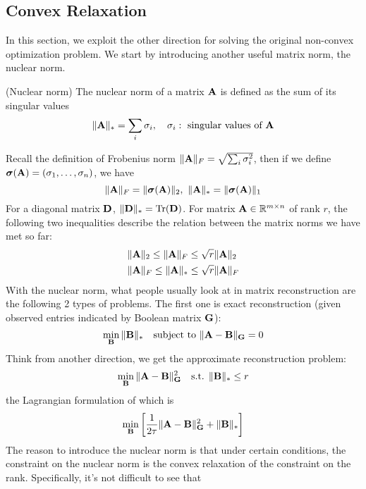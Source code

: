 \documentclass[../book-template.tex]{subfiles}
\begin{document}
\subsection{Convex Relaxation}
In this section, we exploit the other direction for solving the original non-convex optimization problem. We start by introducing another useful matrix norm, the nuclear norm.
\begin{definition}
	(Nuclear norm) The nuclear norm of a matrix ${\bf A}$ is defined as the sum of its singular values
	\begin{equation*}
		\|{\bf A}\|_*=\sum_{i}\sigma_i,\quad \sigma_i:\text{ singular values of }{\bf A}
	\end{equation*}
\end{definition}
Recall the definition of Frobenius norm $\|{\bf A}\|_F=\sqrt{\sum_{i}\sigma_i^2}$, then if we define $\bm{\sigma}({\bf A})=(\sigma_1,\dots,\sigma_n)$, we have
\begin{equation*}
	\|{\bf A}\|_F = \|\bm{\sigma}({\bf A})\|_2,\ \|{\bf A}\|_*=\|\bm{\sigma}({\bf A})\|_1
\end{equation*}
For a diagonal matrix ${\bf D}$, $\|{\bf D}\|_*=\text{Tr}({\bf D})$. For matrix ${\bf A}\in\mathbb{R}^{m\times n}$ of rank $r$, the following two inequalities describe the relation between the matrix norms we have met so far:
\begin{align*}
	&\|{\bf A}\|_2\leq \|{\bf A}\|_F\leq \sqrt{r}\|{\bf A}\|_2\\
	&\|{\bf A}\|_F\leq \|{\bf A}\|_*\leq \sqrt{r}\|{\bf A}\|_F
\end{align*} 
With the nuclear norm, what people usually look at in matrix reconstruction are the following 2 types of problems. The first one is exact reconstruction (given observed entries indicated by Boolean matrix ${\bf G}$):
\begin{equation*}
	\min_{{\bf B}}\|{\bf B}\|_*\quad \text{subject to }\|{\bf A} - {\bf B}\|_{\bf G}=0
\end{equation*}
Think from another direction, we get the approximate reconstruction problem:
\begin{equation*}
\min_{{\bf B}}\|{\bf A} - {\bf B}\|_{\bf G}^2 \quad \text{s.t. }\|{\bf B}\|_*\leq r
\end{equation*}
the Lagrangian formulation of which is
\begin{equation*}
\min_{{\bf B}}\left[\frac{1}{2\tau}\|{\bf A} - {\bf B}\|_{\bf G}^2 +\|{\bf B}\|_*\right]
\end{equation*}
The reason to introduce the nuclear norm is that under certain conditions, the constraint on the nuclear norm is the convex relaxation of the constraint on the rank. Specifically, it's not difficult to see that
\end{document}
